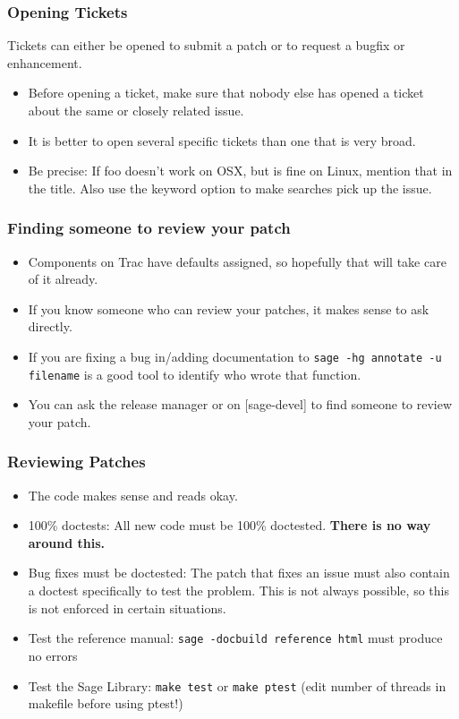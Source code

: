 \documentclass[11pt,blackandwhite]{beamer}
\renewcommand{\emph}[1]{{\color{black}\bf #1}}
\newcommand{\code}{\lstinline}
\begin{document}
\begin{frame}
\frametitle{Opening Tickets}
Tickets can either be opened to submit a patch or to request a bugfix or
enhancement.

\begin{itemize}
 \item Before opening a ticket, make sure that nobody else has opened a ticket
about the same or closely related issue. 
 \item It is better to open several specific tickets than one that is very
broad. 
 \item Be precise: If foo doesn't work on OSX, but is fine on Linux, mention
that in the title. Also use the keyword option to make searches pick up the
issue. 
\end{itemize}
\end{frame}

\begin{frame}
\frametitle{Finding someone to review your patch} 
\begin{itemize}
 \item Components on Trac have defaults assigned, so hopefully that will take
care of it already.
 \item If you know someone who can review your patches, it makes sense to ask
directly.
 \item If you are fixing a bug in/adding documentation to \code{sage -hg
annotate -u filename} is a good tool to identify who wrote that function.
 \item You can ask the release manager or on [sage-devel] to find someone to
review your patch.
\end{itemize}

\end{frame}


\begin{frame}
\frametitle{Reviewing Patches}
\begin{itemize}
\item The code makes sense and reads okay.
\item 100\% doctests: All new code must be 100\% doctested. \emph{There is no
way around this.} 

\item Bug fixes must be doctested: The patch that fixes an issue must also
contain a doctest specifically to test the problem. This is not always possible,
so this is not enforced in certain situations. 

\item Test the reference manual: \texttt{sage -docbuild reference html} must
produce no errors 

\item Test the Sage Library: \texttt{make test} or \texttt{make ptest} (edit
number of threads in
makefile before using ptest!)
\end{itemize}

\end{frame}
\end{document}

